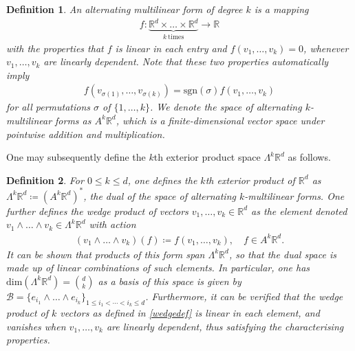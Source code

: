 \documentclass[sn-mathphys-num]{sn-jnl}%
\theoremstyle{thmstyleone}%
\theoremstyle{thmstyletwo}%
\theoremstyle{thmstylethree}%
\newtheorem{definition}{Definition}%
\numberwithin{remark}{section}
\numberwithin{definition}{section}
\numberwithin{equation}{section}
\numberwithin{theorem}{section}
\newcommand{\R}{\ensuremath{\mathbb{R}}}%
\begin{document}
\begin{definition}
    An alternating multilinear form of degree $k$ is a mapping 
    \begin{align*}
    f: \underbrace{\R^{d}\times \dots \times \R^{d}}_{k \ \mathrm{times}}\longrightarrow \R
    \end{align*}
    with the properties that $f$ is linear in each entry and  $f(v_{1},\dots,v_{k})=0$, whenever $v_{1},\dots,v_{k}$ are linearly dependent.
    Note that these two properties automatically imply 
    \begin{align*}
        f(v_{\sigma(1)},\dots,v_{\sigma(k)}) = \mathrm{sgn}(\sigma)f(v_{1},\dots,v_{k})
    \end{align*}
    for all permutations $\sigma$ of $\{1,\dots,k\}$. We denote the space of alternating $k$-multilinear forms as $A^{k}\R^{d}$, which is a finite-dimensional vector space under pointwise addition and multiplication. 
\end{definition}
One may subsequently define the $k$th exterior product space $\Lambda^{k}\R^{d}$ as follows.
\begin{definition}
For $0\leq k\leq d$, one defines the $k$th exterior product of $\R^{d}$ as $\Lambda^{k}\R^{d}\coloneq (A^{k}\R^{d})^{*}$, the dual of the space of alternating $k$-multilinear forms. One further defines the wedge product of vectors $v_{1},\dots,v_{k} \in \R^{d}$ as the element denoted $v_{1}\wedge \dots \wedge v_{k} \in \Lambda^{k}\R^{d}$ with action
\begin{align}\label{wedgedef}
    (v_{1}\wedge \dots \wedge v_{k})(f) \coloneq f(v_{1},\dots,v_{k}),\quad  f \in A^{k}\R^{d}.
\end{align}
It can be shown that products of this form span $\Lambda^{k}\R^{d}$, so that the dual space is made up of linear combinations of such elements. In particular, one has $\mathrm{dim}(\Lambda^{k}\R^{d}) =  \binom{d}{k}$ as a basis of this space is given by $\mathcal{B}=\{e_{i_{1}}\wedge\dots \wedge e_{i_{k}}\}_{1\le i_{1}<\cdots<i_{k}\le d}$. Furthermore, it can be verified that the wedge product of $k$ vectors as defined in \cref{wedgedef} is linear in each element, and vanishes when $v_{1},\dots,v_{k}$ are linearly dependent, thus satisfying the characterising properties.
\end{definition}

\end{document}
